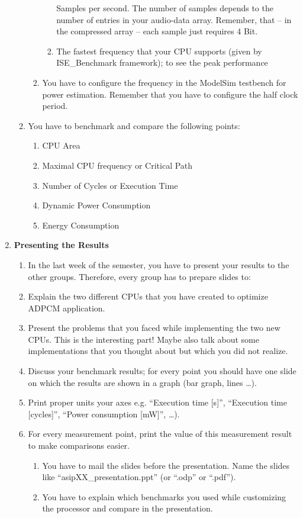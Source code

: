 \begin{enumerate}
\begin{enumerate}
\begin{enumerate}
\begin{enumerate}
					Samples per second. The number of samples depends to the number
					of entries in your audio-data array. Remember, that -- in the
					compressed array -- each sample just requires 4 Bit.
				\item
				The fastest frequency that your CPU supports (given by
					ISE\_Benchmark framework); to see the peak performance
			\end{enumerate}
			\item
			You have to configure the frequency in the ModelSim
				testbench for power estimation. Remember that you have to
				configure the half clock period.
		\end{enumerate}
		\item
		You have to benchmark and compare the following points:
		\begin{enumerate}
			\item
			CPU Area
			\item
			Maximal CPU frequency or Critical Path
			\item
			Number of Cycles or Execution Time
			\item
			Dynamic Power Consumption
			\item
			Energy Consumption
		\end{enumerate}
	\end{enumerate}
\item \textbf{Presenting the Results}
	\begin{enumerate}
		\item
		In the last week of the semester, you have to present your
		results to the other groups. Therefore, every group has to prepare
		slides to:
		\item
		Explain the two different CPUs that you have created to
			optimize ADPCM application.
		\item
		Present the problems that you faced while implementing the
			two new CPUs. This is the interesting part! Maybe also talk about
			some implementations that you thought about but which you did not
			realize.
		\item
		Discuss your benchmark results; for every point you should
			have one slide on which the results are shown in a graph (bar graph,
			lines \ldots).
		\item
		Print proper units your axes e.g. ``Execution time
			{[}s{]}'', ``Execution time {[}cycles{]}'', ``Power consumption
			{[}mW{]}'', \ldots).
		\item
		For every measurement point, print the value of this
		measurement result to make comparisons easier.
		\begin{enumerate}[label=(\alph*),start=5]
			\color{red}\item\normalcolor
			You have to mail the slides before the presentation. Name the slides
			like ``asipXX\_presentation.ppt'' (or ``.odp'' or ``.pdf'').
			\color{red}\item\normalcolor
			You have to explain which benchmarks you used while customizing the
			processor and compare in the presentation.
		\end{enumerate}
	\end{enumerate}
\end{enumerate}
